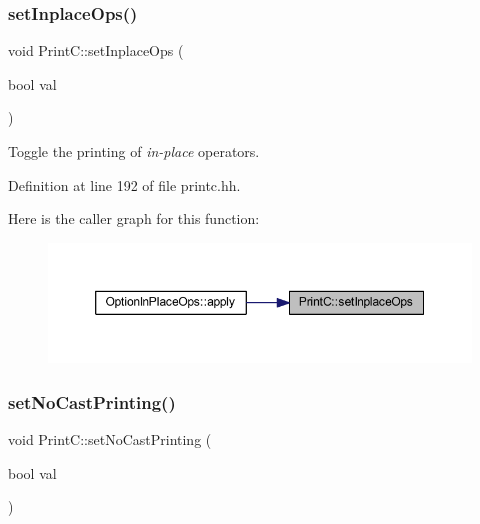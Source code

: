 \mbox{\label{class_print_c_a57ba1ad40fe3c08ab7018c6e591a67e3}} 
\subsubsection{\texorpdfstring{setInplaceOps()}{setInplaceOps()}}
{\footnotesize\ttfamily void Print\+C\+::set\+Inplace\+Ops (\begin{DoxyParamCaption}\item[{bool}]{val }\end{DoxyParamCaption})\hspace{0.3cm}{\ttfamily [inline]}}



Toggle the printing of {\itshape in-\/place} operators. 



Definition at line 192 of file printc.\+hh.

Here is the caller graph for this function\+:
\nopagebreak
\begin{figure}[H]
\begin{center}
\leavevmode
\includegraphics[width=350pt]{class_print_c_a57ba1ad40fe3c08ab7018c6e591a67e3_icgraph}
\end{center}
\end{figure}
\mbox{\label{class_print_c_a6801ebff79bee1bb2c7a413a4edcfb97}} 
\subsubsection{\texorpdfstring{setNoCastPrinting()}{setNoCastPrinting()}}
{\footnotesize\ttfamily void Print\+C\+::set\+No\+Cast\+Printing (\begin{DoxyParamCaption}\item[{bool}]{val }\end{DoxyParamCaption})\hspace{0.3cm}{\ttfamily [inline]}}



